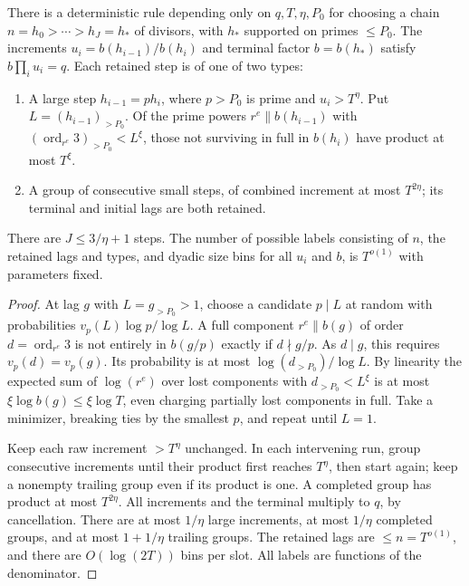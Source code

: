 \begin{lemma}\label{lem:itinerary}
There is a deterministic rule depending only on $q,T,\eta,P_0$ for
choosing a chain $n=h_0>\cdots>h_J=h_*$ of divisors, with
$h_*$ supported on primes $\le P_0$. The increments
$u_i=b(h_{i-1})/b(h_i)$ and terminal factor $b=b(h_*)$ satisfy
$b\prod_i u_i=q$. Each retained step is of one of two types:
\begin{enumerate}
\item A large step $h_{i-1}=ph_i$, where $p>P_0$ is prime and
$u_i>T^\eta$. Put $L=(h_{i-1})_{>P_0}$. Of the prime powers
$r^e\parallel b(h_{i-1})$ with
$(\operatorname{ord}_{r^e}3)_{>P_0}<L^\xi$, those not surviving
in full in $b(h_i)$ have product at most $T^\xi$.
\item A group of consecutive small steps, of combined increment at
most $T^{2\eta}$; its terminal and initial lags are both retained.
\end{enumerate}
There are $J\le 3/\eta+1$ steps.  The number of possible labels
consisting of $n$, the retained lags and types, and dyadic size
bins for all $u_i$ and $b$, is $T^{o(1)}$ with parameters fixed.
\end{lemma}
\begin{proof}
At lag $g$ with $L=g_{>P_0}>1$, choose a candidate $p\mid L$ at random
with probabilities $v_p(L)\log p/\log L$. A full component
$r^e\parallel b(g)$ of order $d=\operatorname{ord}_{r^e}3$ is not
entirely in $b(g/p)$ exactly if $d\nmid g/p$. As $d\mid g$, this
requires $v_p(d)=v_p(g)$. Its probability is at most
$\log(d_{>P_0})/\log L$. By linearity the expected sum of
$\log(r^e)$ over lost components with $d_{>P_0}<L^\xi$ is at most
$\xi\log b(g)\le\xi\log T$, even charging partially lost components
in full. Take a minimizer, breaking ties by the smallest $p$, and
repeat until $L=1$.

Keep each raw increment $>T^\eta$ unchanged. In each intervening
run, group consecutive increments until their product first reaches
$T^\eta$, then start again; keep a nonempty trailing group even if
its product is one. A completed group has product at most $T^{2\eta}$.
All increments and the terminal multiply to $q$, by cancellation.
There are at most $1/\eta$ large increments, at most $1/\eta$
completed groups, and at most $1+1/\eta$ trailing groups.
The retained lags are $\le n=T^{o(1)}$, and there are $O(\log(2T))$
bins per slot. All labels are functions of the denominator.
\end{proof}

